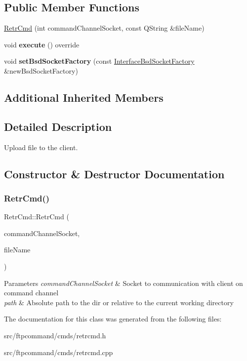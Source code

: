 \subsection*{Public Member Functions}
\begin{DoxyCompactItemize}
\item 
\hyperlink{classRetrCmd_ab20c02dc32c3c300fd3f49dd4da89100}{Retr\+Cmd} (int command\+Channel\+Socket, const Q\+String \&file\+Name)
\item 
\mbox{\label{classRetrCmd_a605eab8d64737d3ebb2625ba5fc373db}} 
void {\bfseries execute} () override
\item 
\mbox{\label{classRetrCmd_afe6eba7844dbcb8d16c18045fee835ae}} 
void {\bfseries set\+Bsd\+Socket\+Factory} (const \hyperlink{classInterfaceBsdSocketFactory}{Interface\+Bsd\+Socket\+Factory} \&new\+Bsd\+Socket\+Factory)
\end{DoxyCompactItemize}
\subsection*{Additional Inherited Members}


\subsection{Detailed Description}
Upload file to the client. 

\subsection{Constructor \& Destructor Documentation}
\mbox{\label{classRetrCmd_ab20c02dc32c3c300fd3f49dd4da89100}} 
\subsubsection{\texorpdfstring{Retr\+Cmd()}{RetrCmd()}}
{\footnotesize\ttfamily Retr\+Cmd\+::\+Retr\+Cmd (\begin{DoxyParamCaption}\item[{int}]{command\+Channel\+Socket,  }\item[{const Q\+String \&}]{file\+Name }\end{DoxyParamCaption})}


\begin{DoxyParams}{Parameters}
{\em command\+Channel\+Socket} & Socket to communication with client on command channel \\
\hline
{\em path} & Absolute path to the dir or relative to the current working directory \\
\hline
\end{DoxyParams}


The documentation for this class was generated from the following files\+:\begin{DoxyCompactItemize}
\item 
src/ftpcommand/cmds/retrcmd.\+h\item 
src/ftpcommand/cmds/retrcmd.\+cpp\end{DoxyCompactItemize}
